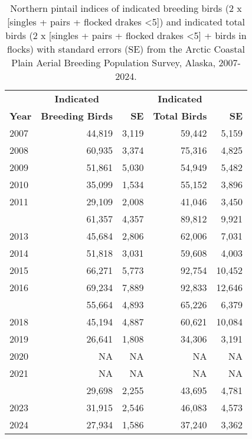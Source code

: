 \documentclass[
]{article}
\begin{document}
\begin{longtable}[t]{lrrrr}

\caption{\label{tbl-NOPI}Northern pintail indices of indicated breeding
birds (2 x {[}singles + pairs + flocked drakes \textless5{]}) and
indicated total birds (2 x {[}singles + pairs + flocked drakes
\textless5{]} + birds in flocks) with standard errors (SE) from the
Arctic Coastal Plain Aerial Breeding Population Survey, Alaska,
2007-2024.}

\tabularnewline

\\
\toprule
\multicolumn{1}{c}{\textbf{ }} & \multicolumn{1}{c}{\textbf{Indicated}} & \multicolumn{1}{c}{\textbf{ }} & \multicolumn{1}{c}{\textbf{Indicated}} & \multicolumn{1}{c}{\textbf{ }} \\
\cmidrule(l{3pt}r{3pt}){2-2} \cmidrule(l{3pt}r{3pt}){4-4}
\textbf{Year} & \textbf{Breeding Birds} & \textbf{SE} & \textbf{Total Birds} & \textbf{SE}\\
\midrule
2007 & 44,819 & 3,119 & 59,442 & 5,159\\
2008 & 60,935 & 3,374 & 75,316 & 4,825\\
2009 & 51,861 & 5,030 & 54,949 & 5,482\\
2010 & 35,099 & 1,534 & 55,152 & 3,896\\
2011 & 29,109 & 2,008 & 41,046 & 3,450\\
\addlinespace
2012 & 61,357 & 4,357 & 89,812 & 9,921\\
2013 & 45,684 & 2,806 & 62,006 & 7,031\\
2014 & 51,818 & 3,031 & 59,608 & 4,003\\
2015 & 66,271 & 5,773 & 92,754 & 10,452\\
2016 & 69,234 & 7,889 & 92,833 & 12,646\\
\addlinespace
2017 & 55,664 & 4,893 & 65,226 & 6,379\\
2018 & 45,194 & 4,887 & 60,621 & 10,084\\
2019 & 26,641 & 1,808 & 34,306 & 3,191\\
2020 & NA & NA & NA & NA\\
2021 & NA & NA & NA & NA\\
\addlinespace
2022 & 29,698 & 2,255 & 43,695 & 4,781\\
2023 & 31,915 & 2,546 & 46,083 & 4,573\\
2024 & 27,934 & 1,586 & 37,240 & 3,362\\
\bottomrule

\end{longtable}
\end{document}

